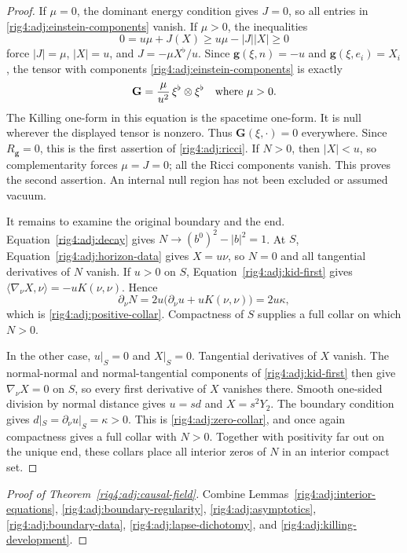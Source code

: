 \begin{proof}
If $\mu=0$, the dominant energy condition gives $J=0$, so all entries in
\eqref{rig4:adj:einstein-components} vanish.  If $\mu>0$, the inequalities
\[
 0=u\mu+J(X)\ge u\mu-|J||X|\ge0
\]
force $|J|=\mu$, $|X|=u$, and $J=-\mu X^\flat/u$.
Since $\mathbf g(\xi,n)=-u$ and $\mathbf g(\xi,e_i)=X_i$, the tensor with
components \eqref{rig4:adj:einstein-components} is exactly
\begin{equation}
 \mathbf G=\frac\mu{u^2}\,\xi^\flat\otimes\xi^\flat
 \quad\hbox{where }\mu>0.
 \label{rig4:adj:null-stress}
\end{equation}
The Killing one-form in this equation is the spacetime one-form.
It is null wherever the displayed tensor is nonzero.  Thus
$\mathbf G(\xi,\cdot)=0$ everywhere.  Since $R_{\mathbf g}=0$, this is the
first assertion of \eqref{rig4:adj:ricci}.  If $N>0$, then $|X|<u$, so
complementarity forces $\mu=J=0$; all the Ricci components vanish.  This proves
the second assertion.  An internal null region has not been excluded or
assumed vacuum.

It remains to examine the original boundary and the end.  Equation~\eqref{rig4:adj:decay}
gives $N\to(b^0)^2-|b|^2=1$.  At $S$, Equation~\eqref{rig4:adj:horizon-data}
gives $X=u\nu$, so $N=0$ and all tangential derivatives of $N$ vanish.
If $u>0$ on $S$, Equation~\eqref{rig4:adj:kid-first} gives
$\langle\nabla_\nu X,\nu\rangle=-uK(\nu,\nu)$.  Hence
\[
 \partial_\nu N
 =2u\bigl(\partial_\nu u+uK(\nu,\nu)\bigr)=2u\kappa,
\]
which is \eqref{rig4:adj:positive-collar}.  Compactness of $S$ supplies a full
collar on which $N>0$.

In the other case, $u|_S=0$ and $X|_S=0$.  Tangential derivatives of $X$
vanish.  The normal-normal and normal-tangential components of
\eqref{rig4:adj:kid-first} then give $\nabla_\nu X=0$ on $S$, so every first
derivative of $X$ vanishes there.  Smooth one-sided division by normal
distance gives $u=sd$ and $X=s^2Y_2$.  The boundary condition gives
$d|_S=\partial_\nu u|_S=\kappa>0$.  This is
\eqref{rig4:adj:zero-collar}, and once again compactness gives a full collar
with $N>0$.  Together with positivity far out on the unique end, these
collars place all interior zeros of $N$ in an interior compact set.
\end{proof}

\begin{proof}[Proof of Theorem~\ref{rig4:adj:causal-field}]
Combine Lemmas~\ref{rig4:adj:interior-equations},
\ref{rig4:adj:boundary-regularity}, \ref{rig4:adj:asymptotics},
\ref{rig4:adj:boundary-data}, \ref{rig4:adj:lapse-dichotomy}, and
\ref{rig4:adj:killing-development}.
\end{proof}
